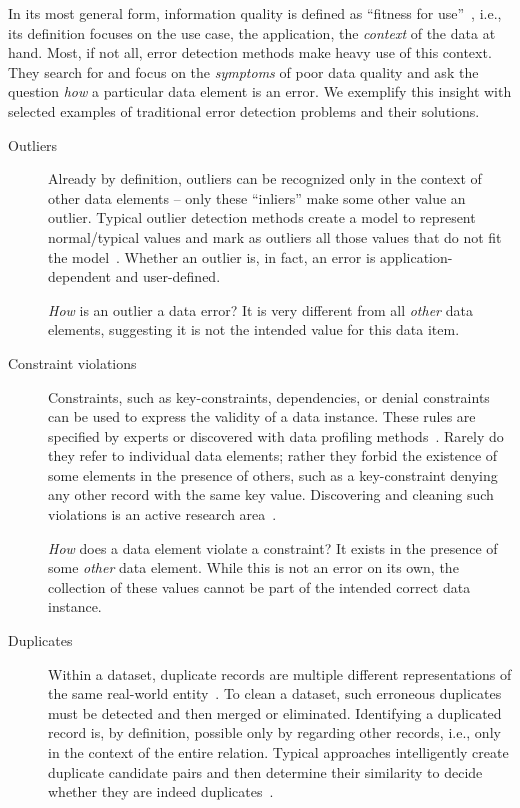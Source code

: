 \documentclass[11pt]{article}
\begin{document}
In its most general form, information quality is defined as ``fitness for use''~\cite{Strong96}, i.e., its definition focuses on the use case, the application, the \emph{context} of the data at hand. Most, if not all, error detection methods make heavy use of this context. They search for and focus on the \emph{symptoms} of poor data quality and ask the question \emph{how} a particular data element is an error.
We exemplify this insight with selected examples of traditional error detection problems and their solutions.
\begin{description}
  \item[Outliers] Already by definition, outliers can be recognized only in the context of other data elements -- only these ``inliers'' make some other value an outlier. Typical outlier detection methods create a model to represent normal/typical values and mark as outliers all those values that do not fit the model~\cite{Aggarwal2013}. Whether an outlier is, in fact, an error is application-dependent and user-defined.
  
  \emph{How} is an outlier a data error? It is very different from all \emph{other} data elements, suggesting it is not the intended value for this data item.
  
  \item[Constraint violations] Constraints, such as key-constraints, dependencies, or denial constraints can be used to express the validity of a data instance. These rules are specified by experts or discovered with data profiling methods~\cite{Abedjan2018}. Rarely do they refer to individual data elements; rather they forbid the existence of some elements in the presence of others, such as a key-constraint denying any other record with the same key value. Discovering and cleaning such violations is an active research area~\cite{IlyasC15}.
  
  \emph{How} does a data element violate a constraint? It exists in the presence of some \emph{other} data element. While this is not an error on its own, the collection of these values cannot be part of the intended correct data instance. %
  
  \item[Duplicates] Within a dataset, duplicate records are multiple different representations of the same real-world entity~\cite{Naumann10}. To clean a dataset, such erroneous duplicates must be detected and then merged or eliminated. Identifying a duplicated record is, by definition, possible only by regarding other records, i.e., only in the context of the entire relation. Typical approaches intelligently create duplicate candidate pairs and then determine their similarity to decide whether they are indeed duplicates~\cite{Papadakis21}.
  

\end{description}
\end{document}
